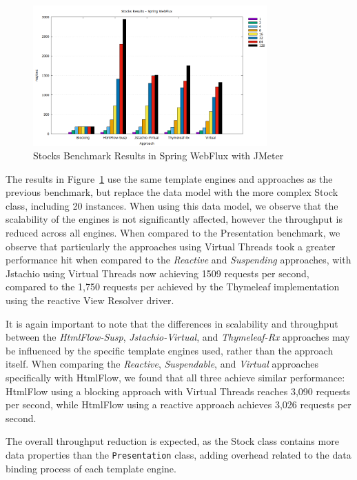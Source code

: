 \begin{figure}[h]
     \centering
     \includegraphics[width=0.8\textwidth]{./Graphs/stocks-webflux-jmeter.png}
     \caption{Stocks Benchmark Results in Spring WebFlux with JMeter}\label{fig:stocks-webflux-jmeter}
\end{figure}

The results in Figure~\ref{fig:stocks-webflux-jmeter} use the same template
engines and approaches as the previous benchmark, but replace the data model
with the more complex Stock class, including 20 instances. When using this data
model, we observe that the scalability of the engines is not significantly
affected, however the throughput is reduced across all engines. When compared
to the Presentation benchmark, we observe that particularly the approaches
using Virtual Threads took a greater performance hit when compared to the
\textit{Reactive} and \textit{Suspending} approaches, with Jstachio using
Virtual Threads now achieving 1509 requests per second, compared to the 1,750
requests per achieved by the Thymeleaf implementation using the reactive View
Resolver driver.

It is again important to note that the differences in scalability and
throughput between the \textit{HtmlFlow-Susp}, \textit{Jstachio-Virtual}, and
\textit{Thymeleaf-Rx} approaches may be influenced by the specific template
engines used, rather than the approach itself. When comparing the
\textit{Reactive}, \textit{Suspendable}, and \textit{Virtual} approaches
specifically with HtmlFlow, we found that all three achieve similar
performance: HtmlFlow using a blocking approach with Virtual Threads reaches
3,090 requests per second, while HtmlFlow using a reactive approach achieves
3,026 requests per second.

The overall throughput reduction is expected, as the Stock class contains more
data properties than the \texttt{Presentation} class, adding overhead related
to the data binding process of each template engine.

